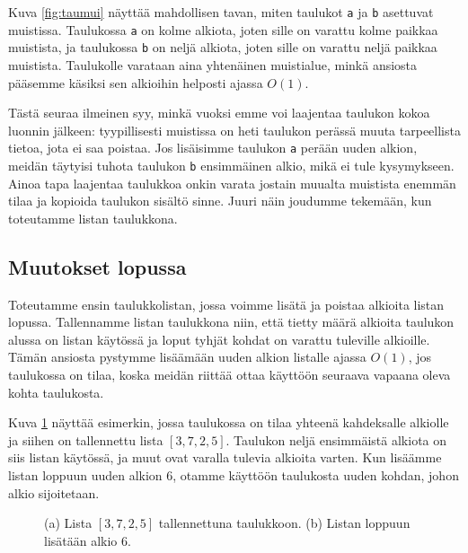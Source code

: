 Kuva \ref{fig:taumui} näyttää mahdollisen tavan, miten taulukot
\texttt{a} ja \texttt{b} asettuvat muistissa.
Taulukossa \texttt{a} on kolme alkiota,
joten sille on varattu kolme paikkaa muistista,
ja taulukossa \texttt{b} on neljä alkiota,
joten sille on varattu neljä paikkaa muistista.
Taulukolle varataan aina yhtenäinen muistialue,
minkä ansiosta pääsemme käsiksi sen alkioihin
helposti ajassa $O(1)$.

Tästä seuraa ilmeinen syy,
minkä vuoksi emme voi laajentaa taulukon kokoa
luonnin jälkeen:
tyypillisesti muistissa on heti taulukon perässä muuta
tarpeellista tietoa, jota ei saa poistaa.
Jos lisäisimme taulukon \texttt{a} perään uuden alkion,
meidän täytyisi tuhota taulukon \texttt{b} ensimmäinen alkio,
mikä ei tule kysymykseen.
Ainoa tapa laajentaa taulukkoa onkin varata
jostain muualta muistista enemmän tilaa ja kopioida
taulukon sisältö sinne.
Juuri näin joudumme tekemään, kun toteutamme listan taulukkona.

\subsection{Muutokset lopussa}

Toteutamme ensin taulukkolistan, jossa voimme
lisätä ja poistaa alkioita listan lopussa.
Tallennamme listan taulukkona niin,
että tietty määrä alkioita taulukon alussa on listan käytössä
ja loput tyhjät kohdat on varattu tuleville alkioille.
Tämän ansiosta pystymme lisäämään uuden alkion listalle
ajassa $O(1)$, jos taulukossa on tilaa,
koska meidän riittää ottaa käyttöön seuraava
vapaana oleva kohta taulukosta.

Kuva \ref{fig:listau} näyttää esimerkin,
jossa taulukossa on tilaa yhteenä kahdeksalle alkiolle
ja siihen on tallennettu lista $[3,7,2,5]$.
Taulukon neljä ensimmäistä alkiota on siis listan käytössä,
ja muut ovat varalla tulevia alkioita varten.
Kun lisäämme listan loppuun uuden alkion 6,
otamme käyttöön taulukosta uuden kohdan, johon alkio sijoitetaan.

\begin{figure}
\center
{}
\caption{(a) Lista $[3,7,2,5]$ tallennettuna taulukkoon. (b) Listan loppuun lisätään alkio 6.}
\label{fig:listau}
\end{figure}

